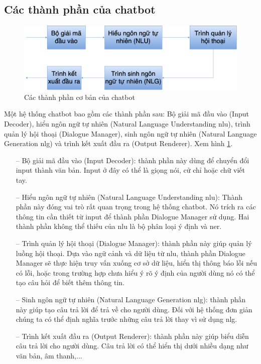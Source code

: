 \subsection{Các thành phần của chatbot}
\begin{figure}[htp]
    \centering
    \includegraphics[width=15cm]{images/Kiến trúc cơ bản của hệ thống giao tiếp tự động.png}
    \caption{Các thành phần cơ bản của chatbot}
    \label{fig:Kiến trúc cơ bản của hệ thống giao tiếp tự động}
\end{figure}
Một hệ thống chatbot bao gồm các thành phần sau: Bộ giải mã đầu vào (Input Decoder), hiểu ngôn ngữ tự nhiên (Natural Language Understanding \ac{nlu}), trình quản lý hội thoại (Dialogue Manager), sinh ngôn ngữ tự nhiên (Natural Language Generation \ac{nlg}) và trình kết xuất đầu ra (Output Renderer). Xem hình \ref{fig:Kiến trúc cơ bản của hệ thống giao tiếp tự động}.

\begin{itemize}
  \item[--] Bộ giải mã đầu vào (Input Decoder): thành phần này dùng để chuyển đổi input thành văn bản. Input ở đây có thể là giọng nói, cử chỉ hoặc chữ viết tay. 
    \item[--] Hiểu ngôn ngữ tự nhiên (Natural Language Understanding \ac{nlu}): Thành phần này đóng vai trò rất quan trọng trong hệ thống chatbot. Nó trích ra các thông tin cần thiết từ input để thành phần Dialogue Manager sử dụng. Hai thành phần không thể thiếu của \ac{nlu} là bộ phân loại ý định và \ac{ner}. 
        \item[--] Trình quản lý hội thoại (Dialogue Manager): thành phần này giúp quản lý luồng hội thoại. Dựa vào ngữ cảnh và dữ liệu từ \ac{nlu}, thành phần Dialogue Manager sẽ thực hiện truy vấn xuống cơ sở dữ liệu, hiển thị thông báo lỗi nếu có lỗi, hoặc trong trường hợp chưa hiểu ý rõ ý định của người dùng nó có thể tạo câu hỏi để biết thêm thông tin.
        \item[--] Sinh ngôn ngữ tự nhiên (Natural Language Generation \ac{nlg}): thành phần này giúp tạo câu trả lời để trả về cho người dùng. Đối với hệ thống đơn giản chúng ta có thể định nghĩa trước những câu trả lời thay vì sử dụng \ac{nlg}.
         \item[--] Trình kết xuất đầu ra (Output Renderer): thành phần này giúp biểu diễn câu trả lời cho người dùng. Câu trả lời có thể hiển thị dưới nhiều dạng như văn bản, âm thanh,...

\end{itemize}

